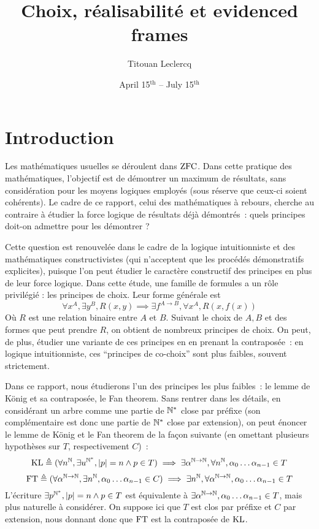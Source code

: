 \documentclass{article}
\title{Choix, réalisabilité et evidenced frames}
\author{Titouan Leclercq}
\date{April 15$^{\mathrm{th}}$ -- July 15$^{\mathrm{th}}$}
\begin{document}
\maketitle

\tableofcontents

\section{Introduction}

Les mathématiques usuelles se déroulent dans $\mathrm{ZFC}$. Dans cette pratique des mathématiques, l'objectif est de démontrer un maximum de résultats, sans considération pour les moyens logiques employés (sous réserve que ceux-ci soient cohérents). Le cadre de ce rapport, celui des mathématiques à rebours, cherche au contraire à étudier la force logique de résultats déjà démontrés~: quels principes doit-on admettre pour les démontrer ?

Cette question est renouvelée dans le cadre de la logique intuitionniste et des mathématiques constructivistes (qui n'acceptent que les procédés démonstratifs explicites), puisque l'on peut étudier le caractère constructif des principes en plus de leur force logique. Dans cette étude, une famille de formules a un rôle privilégié : les principes de choix. Leur forme générale est
\[\forall x^A, \exists y^B, R(x,y) \implies \exists f^{A\to B}, \forall x^A, R(x,f(x))\]
Où $R$ est une relation binaire entre $A$ et $B$. Suivant le choix de $A,B$ et des formes que peut prendre $R$, on obtient de nombreux principes de choix. On peut, de plus, étudier une variante de ces principes en en prenant la contraposée~: en logique intuitionniste, ces ``principes de co-choix'' sont plus faibles, souvent strictement.

Dans ce rapport, nous étudierons l'un des principes les plus faibles~: le lemme de König et sa contraposée, le Fan theorem. Sans rentrer dans les détails, en considérant un arbre comme une partie de $\mathbb{N}^*$ close par préfixe (son complémentaire est donc une partie de $\mathbb{N}^*$ close par extension), on peut énoncer le lemme de König et le Fan theorem de la façon suivante (en omettant plusieurs hypothèses sur $T$, respectivement $C$)~:
\[\mathrm{KL} \triangleq (\forall n^{\mathbb{N}}, \exists u^{\mathbb{N}^*}, |p| = n \land p \in T) \implies \exists \alpha^{\mathbb{N}\to\mathbb{N}}, \forall n^{\mathbb{N}}, \alpha_0\ldots\alpha_{n-1}\in T\]
\[\mathrm{FT} \triangleq (\forall \alpha^{\mathbb{N}\to\mathbb{N}}, \exists n^{\mathbb{N}}, \alpha_0\ldots \alpha_{n-1}\in C)\implies \exists n^{\mathbb{N}}, \forall \alpha^{\mathbb{N}\to\mathbb{N}}, \alpha_0\ldots\alpha_{n-1}\in T\]
L'écriture $\exists p^{\mathbb{N}^*},|p| = n \land p \in T$ est équivalente à $\exists \alpha^{\mathbb{N}\to\mathbb{N}}, \alpha_0\ldots\alpha_{n-1}\in T$, mais plus naturelle à considérer. On suppose ici que $T$ est clos par préfixe et $C$ par extension, nous donnant donc que $\mathrm{FT}$ est la contraposée de $\mathrm{KL}$.
\end{document}
